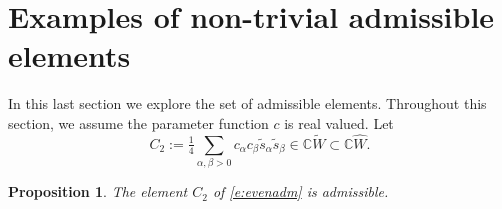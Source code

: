 \documentclass[10pt,a4paper]{amsart}
\numberwithin{equation}{section}
\newtheorem{Proposition}[Theorem]{Proposition}
 { \theoremstyle{definition}
\newtheorem{Definition}[Theorem]{Definition}
\newtheorem{Note}[Theorem]{Note}
\newtheorem{Example}[Theorem]{Example}
\newtheorem{Remark}[Theorem]{Remark} }
\newcommand{\bbc}{\mathbb{C}}
\begin{document}
\section{Examples of non-trivial admissible elements}\label{s:AdmElem}

In this last section we explore the set of admissible elements. Throughout this section, we assume the parameter function $c$ is real valued. Let
\begin{equation}\label{e:evenadm}
C_2 := \tfrac{1}{4}\sum_{\alpha,\beta>0}c_\alpha c_\beta \tilde{s}_\alpha\tilde{s}_\beta \in \bbc\tilde W\subset \bbc\hat{W}.
\end{equation}

\begin{Proposition}
The element $C_2$ of \eqref{e:evenadm} is admissible.
\end{Proposition}
\end{document}
